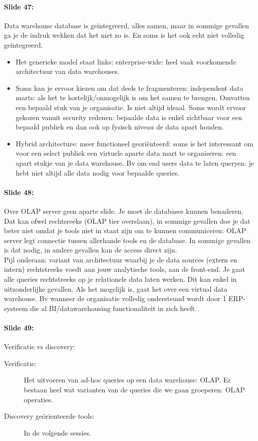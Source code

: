 \documentclass[10pt,a4paper]{report}
\begin{document}
\paragraph{Slide 47:}Data warehouse database is geïntegreerd, alles samen, maar in sommige gevallen ga je de indruk wekken dat het niet zo is. En soms is het ook echt niet volledig geïntegreerd. 
\begin{itemize}
\item Het generieke model staat links: enterprise-wide: heel vaak voorkomende architectuur van data warehouses. 
\item Soms kan je ervoor kiezen om dat deels te fragmenteren: independent data marts: als het te kostelijk/onmogelijk is om het samen te brengen. Omvatten een bepaald stuk van je organisatie. Is niet altijd ideaal. Soms wordt ervoor gekozen vanuit security redenen: bepaalde data is enkel zichtbaar voor een bepaald publiek en dan ook op fysisch niveau de data apart houden.
\item Hybrid architecture: meer functioneel geori\"enteerd: soms is het interessant om voor een select publiek een virtuele aparte data mart te organiseren: een apart stukje van je data warehouse. Bv om end users data te laten queryen: je hebt niet altijd alle data nodig voor bepaalde queries.
\end{itemize}

\paragraph{Slide 48:}Over OLAP server geen aparte slide. Je moet de databases kunnen benaderen. Dat kan ofwel rechtsreeks (OLAP tier overslaan), in sommige gevallen doe je dat beter niet omdat je tools niet in staat zijn om te kunnen communiceren: OLAP server legt connectie tussen allerhande tools en de database. In sommige gevallen is dat nodig, in andere gevallen kan de access direct zijn.\\
Pijl onderaan: variant van architectuur waarbij je de data sources (extern en intern) rechtstreeks voedt aan jouw analytische tools, aan de front-end. Je gaat alle queries rechtstreeks op je relationele data laten werken. Dit kan enkel in uitzonderlijke gevallen. Als het mogelijk is, gaat het over een virtual data warehouse. Bv wanneer de organisatie volledig ondersteund wordt door 1 ERP-systeem die al BI/datawarehousing functionaliteit in zich heeft.

\paragraph{Slide 49:}Verificatie vs discovery:
\begin{description}
\item[Verificatie:]Het uitvoeren van ad-hoc queries op een data warehouse: OLAP. Er bestaan heel wat varianten van de queries die we gaan groeperen: OLAP operaties.
\item[Discovery geörienteerde tools:]In de volgende sessies.
\end{description}
\end{document}
